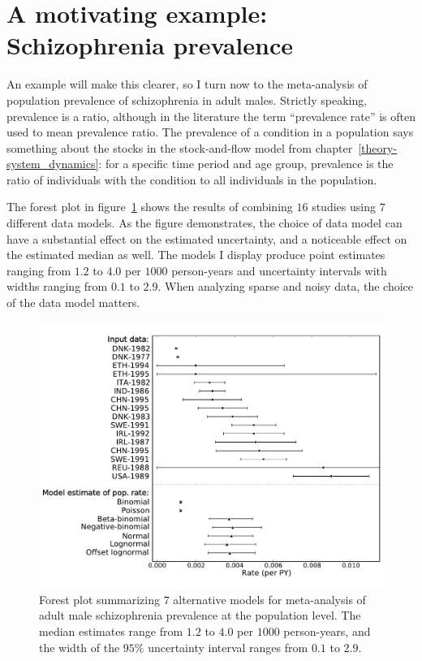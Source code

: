 \section{A motivating example: Schizophrenia prevalence}
An example will make this clearer, so I turn now to the meta-analysis
of population prevalence of schizophrenia in adult males.  Strictly
speaking, prevalence is a ratio, although in the
literature the term ``prevalence rate'' is often used to mean
prevalence ratio.  The prevalence of a condition in a population says
something about the stocks in the stock-and-flow model from
chapter~\ref{theory-system_dynamics}: for a specific time period and
age group, prevalence is the ratio of individuals with the condition
to all individuals in the population.

The forest plot in figure~\ref{rate-model-schiz-forest} shows the
results of combining $16$ studies using $7$ different data models.  As
the figure demonstrates, the choice of data model can have a
substantial effect on the estimated uncertainty, and a
noticeable effect on the estimated median as well. The models I
display produce point estimates ranging from $1.2$ to $4.0$ per
$1000$ person-years and uncertainty intervals with widths ranging from $0.1$ to
$2.9$.  When analyzing sparse and noisy data, the choice of the data model
matters.

\begin{figure}[h]
\begin{center}
\includegraphics[width=\textwidth]{schiz_forest.pdf}
\caption{Forest plot summarizing $7$ alternative models for
  meta-analysis of adult male schizophrenia prevalence at the
  population level.  The median estimates range from
  $1.2$ to
  $4.0$ per $1000$ person-years, and the width of the
  $95\%$ uncertainty interval ranges from
  $0.1$ to
  $2.9$.}
\label{rate-model-schiz-forest}
\end{center}
\end{figure}

